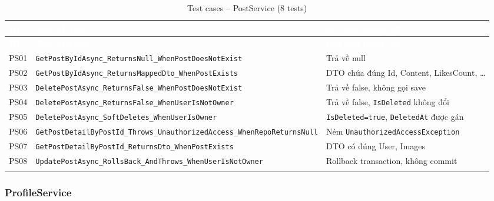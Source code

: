 \documentclass[a4paper]{article}
\begin{document}
\begin{longtable}{|C{0.8cm}|L{5.4cm}|L{7.4cm}|}
\hline
{}
\textcolor{white}{\textbf{ID}} &
\textcolor{white}{\textbf{Test Method}} &
\textcolor{white}{\textbf{Kết quả mong đợi}} \\
\hline
\endfirsthead
\hline
{}
\textcolor{white}{\textbf{ID}} &
\textcolor{white}{\textbf{Test Method}} &
\textcolor{white}{\textbf{Kết quả mong đợi}} \\
\hline
\endhead
\hline
\endfoot

PS01 & \texttt{GetPostByIdAsync\_ReturnsNull\_WhenPostDoesNotExist} & Trả về null \\
\hline
PS02 & \texttt{GetPostByIdAsync\_ReturnsMappedDto\_WhenPostExists} & DTO chứa đúng Id, Content, LikesCount, \ldots \\
\hline
{}
PS03 & \texttt{DeletePostAsync\_ReturnsFalse\_WhenPostDoesNotExist} & Trả về false, không gọi save \\
\hline
PS04 & \texttt{DeletePostAsync\_ReturnsFalse\_WhenUserIsNotOwner} & Trả về false, \texttt{IsDeleted} không đổi \\
\hline
{}
PS05 & \texttt{DeletePostAsync\_SoftDeletes\_WhenUserIsOwner} & \texttt{IsDeleted=true}, \texttt{DeletedAt} được gán \\
\hline
PS06 & \texttt{GetPostDetailByPostId\_Throws\_UnauthorizedAccess\_WhenRepoReturnsNull} & Ném \texttt{UnauthorizedAccessException} \\
\hline
{}
PS07 & \texttt{GetPostDetailByPostId\_ReturnsDto\_WhenPostExists} & DTO có đúng User, Images \\
\hline
PS08 & \texttt{UpdatePostAsync\_RollsBack\_AndThrows\_WhenUserIsNotOwner} & Rollback transaction, không commit \\
\hline
\caption{Test cases -- PostService (8 tests)}
\end{longtable}

\subsubsection{ProfileService}
\end{document}
